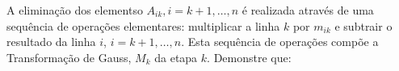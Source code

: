 % 
% 
% 
% 
% 
% 
%
%
\begin{questions}
    \question A elimina\c{c}\~{a}o dos elementso $A_{ik}, i = k + 1, \ldots, n$ \'{e} realizada atrav\'{e}s de uma sequ\^{e}ncia de opera\c{c}\~{o}es elementares: multiplicar a linha $k$ por $m_{ik}$ e subtrair o resultado da linha $i$, $i = k + 1, \ldots, n$. Esta sequ\^{e}ncia de opera\c{c}\~{o}es comp\~{o}e a Transforma\c{c}\~{a}o de Gauss, $M_k$ da etapa $k$. Demonstre que:
\end{questions}
